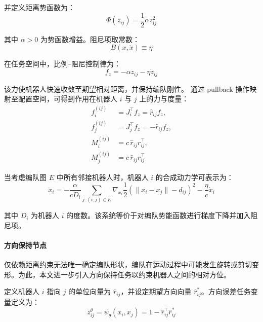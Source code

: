 并定义距离势函数为：
\begin{equation}
    \Phi(z_{ij}) = \frac{1}{2} \alpha z_{ij}^2
\end{equation}

其中 $\alpha > 0$ 为势函数增益。阻尼项取常数：
\begin{equation}
    B(x,\dot x) \equiv \eta
\end{equation}

在任务空间中，比例–阻尼控制律为：
\begin{equation}
     f_z = -\alpha z_{ij} - \eta \dot z_{ij}
\end{equation}

该力使机器人快速收敛至期望相对距离，并保持编队刚性。
通过 pullback 操作映射至配置空间，可得到作用在机器人 $i$ 与 $j$ 上的力与度量：
\begin{equation}
\begin{aligned}
    f_i^{(ij)} &= J_i^\top f_z = \hat r_{ij} f_z, \\
    f_j^{(ij)} &= J_j^\top f_z = -\hat r_{ij} f_z, \\
    M_i^{(ij)} &= c\,\hat r_{ij}\hat r_{ij}^\top, \\
    M_j^{(ij)} &= c\,\hat r_{ij}\hat r_{ij}^\top
\end{aligned}
\end{equation}

当考虑编队图 $E$ 中所有邻接机器人时，机器人 $i$ 的合成动力学可表示为：
\begin{equation}
    \ddot{x}_i =
    -\frac{\alpha}{c D_i}
    \sum_{j:(i,j)\in E}
    \nabla_{x_i}
    \frac{1}{2}
    \left(\|x_i - x_j\| - d_{ij}\right)^2
    - \frac{\eta}{c} \dot{x}_i
\end{equation}

其中 $D_i$ 为机器人 $i$ 的度数。该系统等价于对编队势能函数进行梯度下降并加入阻尼项。

\paragraph{方向保持节点}
仅依赖距离约束无法唯一确定编队形状，编队在运动过程中可能发生旋转或剪切变形。为此，本文进一步引入方向保持任务以约束机器人之间的相对方位。

定义机器人 $i$ 指向 $j$ 的单位向量为 $\hat r_{ij}$，并设定期望方向向量 $\hat r_{ij}^*$。方向误差任务变量定义为：
\begin{equation}
    z_{ij}^{\theta} =
    \psi_\theta(x_i, x_j)
    =
    1 - \hat r_{ij}^\top \hat r_{ij}^*
\end{equation}

